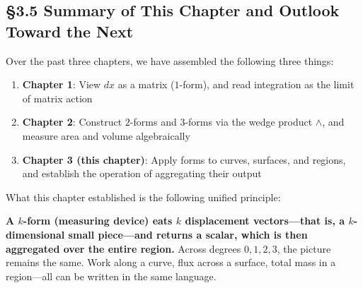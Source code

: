 \documentclass[a4paper,12pt,openany]{book}
\providecommand{\tightlist}{%
  \setlength{\itemsep}{0pt}\setlength{\parskip}{0pt}}
\begin{document}
\hypertarget{summary-of-this-chapter-and-outlook-toward-the-next-1}{%
\subsection{§3.5 Summary of This Chapter and Outlook Toward the
Next}\label{summary-of-this-chapter-and-outlook-toward-the-next-1}}

Over the past three chapters, we have assembled the following three
things:

\begin{enumerate}
\def\labelenumi{\arabic{enumi}.}
\tightlist
\item
  \textbf{Chapter 1}: View \(dx\) as a matrix (\(1\)-form), and read
  integration as the limit of matrix action
\item
  \textbf{Chapter 2}: Construct \(2\)-forms and \(3\)-forms via the
  wedge product \(\wedge\), and measure area and volume algebraically
\item
  \textbf{Chapter 3 (this chapter)}: Apply forms to curves, surfaces,
  and regions, and establish the operation of aggregating their output
\end{enumerate}

What this chapter established is the following unified principle:

\textbf{A $k$-form (measuring device) eats $k$ displacement vectors—that is, a $k$-dimensional small piece—and returns a scalar, which is then aggregated over the entire region.}
Across degrees \(0,1,2,3\), the picture remains the same. Work along a
curve, flux across a surface, total mass in a region—all can be
written in the same language.
\end{document}
